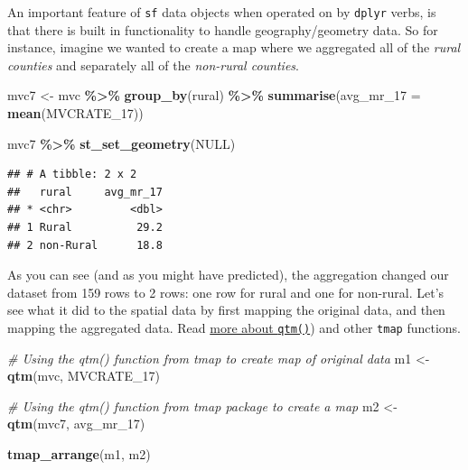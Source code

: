 \documentclass[
]{book}
\newenvironment{Shaded}{\begin{snugshade}}{\end{snugshade}}
\newcommand{\AttributeTok}[1]{\textcolor[rgb]{0.13,0.29,0.53}{#1}}
\newcommand{\CommentTok}[1]{\textcolor[rgb]{0.56,0.35,0.01}{\textit{#1}}}
\newcommand{\ConstantTok}[1]{\textcolor[rgb]{0.56,0.35,0.01}{#1}}
\newcommand{\FunctionTok}[1]{\textcolor[rgb]{0.13,0.29,0.53}{\textbf{#1}}}
\newcommand{\NormalTok}[1]{#1}
\newcommand{\OtherTok}[1]{\textcolor[rgb]{0.56,0.35,0.01}{#1}}
\newcommand{\SpecialCharTok}[1]{\textcolor[rgb]{0.81,0.36,0.00}{\textbf{#1}}}
\newcommand{\StringTok}[1]{\textcolor[rgb]{0.31,0.60,0.02}{#1}}
\begin{document}
An important feature of \texttt{sf} data objects when operated on by \texttt{dplyr} verbs, is that there is built in functionality to handle geography/geometry data. So for instance, imagine we wanted to create a map where we aggregated all of the \emph{rural counties} and separately all of the \emph{non-rural counties}.

\begin{Shaded}
\begin{Highlighting}[]
\NormalTok{mvc7 }\OtherTok{\textless{}{-}}\NormalTok{ mvc }\SpecialCharTok{\%\textgreater{}\%}
  \FunctionTok{group\_by}\NormalTok{(rural) }\SpecialCharTok{\%\textgreater{}\%}
  \FunctionTok{summarise}\NormalTok{(}\AttributeTok{avg\_mr\_17 =} \FunctionTok{mean}\NormalTok{(MVCRATE\_17))}

\NormalTok{mvc7 }\SpecialCharTok{\%\textgreater{}\%} \FunctionTok{st\_set\_geometry}\NormalTok{(}\ConstantTok{NULL}\NormalTok{)}
\end{Highlighting}
\end{Shaded}

\begin{verbatim}
## # A tibble: 2 x 2
##   rural     avg_mr_17
## * <chr>         <dbl>
## 1 Rural          29.2
## 2 non-Rural      18.8
\end{verbatim}

As you can see (and as you might have predicted), the aggregation changed our dataset from 159 rows to 2 rows: one row for rural and one for non-rural. Let's see what it did to the spatial data by first mapping the original data, and then mapping the aggregated data. Read \protect\hyperlink{qtm}{more about \texttt{qtm()}}) and other \texttt{tmap} functions.

\begin{Shaded}
\begin{Highlighting}[]
\CommentTok{\# Using the qtm() function from tmap to create map of original data}
\NormalTok{m1 }\OtherTok{\textless{}{-}} \FunctionTok{qtm}\NormalTok{(mvc, }\StringTok{\textquotesingle{}MVCRATE\_17\textquotesingle{}}\NormalTok{)}

\CommentTok{\# Using the qtm() function from tmap package to create a map}
\NormalTok{m2 }\OtherTok{\textless{}{-}} \FunctionTok{qtm}\NormalTok{(mvc7, }\StringTok{\textquotesingle{}avg\_mr\_17\textquotesingle{}}\NormalTok{)}

\FunctionTok{tmap\_arrange}\NormalTok{(m1, m2)}
\end{Highlighting}
\end{Shaded}
\end{document}
